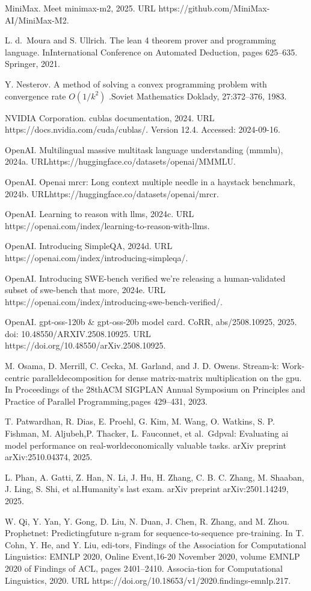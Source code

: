 \documentclass[
  10
]{article}
\begin{document}
MiniMax. Meet minimax-m2, 2025. URL
https://github.com/MiniMax-AI/MiniMax-M2.

L. d.~Moura and S. Ullrich. The lean 4 theorem prover and programming
language. InInternational Conference on Automated Deduction, pages
625--635. Springer, 2021.

Y. Nesterov. A method of solving a convex programming problem with
convergence rate \(O ( 1 / k ^ { 2 } )\) .Soviet Mathematics Doklady,
27:372--376, 1983.

NVIDIA Corporation. cublas documentation, 2024. URL
https://docs.nvidia.com/cuda/cublas/. Version 12.4. Accessed:
2024-09-16.

OpenAI. Multilingual massive multitask language understanding (mmmlu),
2024a. URLhttps://huggingface.co/datasets/openai/MMMLU.

OpenAI. Openai mrcr: Long context multiple needle in a haystack
benchmark, 2024b. URLhttps://huggingface.co/datasets/openai/mrcr.

OpenAI. Learning to reason with llms, 2024c. URL
https://openai.com/index/learning-to-reason-with-llms.

OpenAI. Introducing SimpleQA, 2024d. URL
https://openai.com/index/introducing-simpleqa/.

OpenAI. Introducing SWE-bench verified we're releasing a human-validated
subset of swe-bench that more, 2024e. URL
https://openai.com/index/introducing-swe-bench-verified/.

OpenAI. gpt-oss-120b \& gpt-oss-20b model card. CoRR, abs/2508.10925,
2025. doi: 10.48550/ARXIV.2508.10925. URL
https://doi.org/10.48550/arXiv.2508.10925.

M. Osama, D. Merrill, C. Cecka, M. Garland, and J. D. Owens. Stream-k:
Work-centric paralleldecomposition for dense matrix-matrix
multiplication on the gpu. In Proceedings of the 28thACM SIGPLAN Annual
Symposium on Principles and Practice of Parallel Programming,pages
429--431, 2023.

T. Patwardhan, R. Dias, E. Proehl, G. Kim, M. Wang, O. Watkins, S. P.
Fishman, M. Aljubeh,P. Thacker, L. Fauconnet, et al.~Gdpval: Evaluating
ai model performance on real-worldeconomically valuable tasks. arXiv
preprint arXiv:2510.04374, 2025.

L. Phan, A. Gatti, Z. Han, N. Li, J. Hu, H. Zhang, C. B. C. Zhang, M.
Shaaban, J. Ling, S. Shi, et al.Humanity's last exam. arXiv preprint
arXiv:2501.14249, 2025.

W. Qi, Y. Yan, Y. Gong, D. Liu, N. Duan, J. Chen, R. Zhang, and M. Zhou.
Prophetnet: Predictingfuture n-gram for sequence-to-sequence
pre-training. In T. Cohn, Y. He, and Y. Liu, edi-tors, Findings of the
Association for Computational Linguistics: EMNLP 2020, Online
Event,16-20 November 2020, volume EMNLP 2020 of Findings of ACL, pages
2401--2410. Associa-tion for Computational Linguistics, 2020. URL
https://doi.org/10.18653/v1/2020.findings-emnlp.217.
\end{document}
